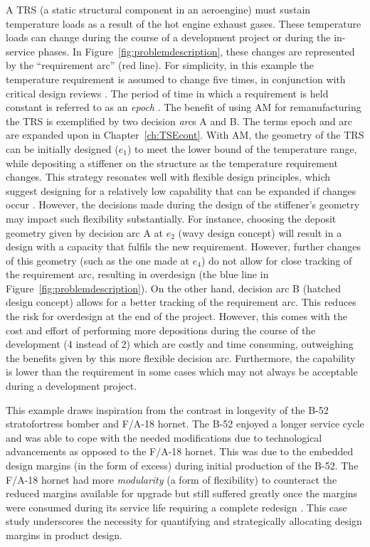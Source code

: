 A \acf{TRS} (a static structural component in an aeroengine) must sustain temperature loads as a result of the hot engine exhaust gases. These temperature loads can change during the course of a development project or during the in-service phases. In Figure~\ref{fig:problemdescription}, these changes are represented by the “requirement arc” (red line). For simplicity, in this example the temperature requirement is assumed to change five times, in conjunction with critical design reviews \cite{Cooper2008}. The period of time in which a requirement is held constant is referred to as an \textit{epoch} \cite{McManus2007}. The benefit of using \ac{AM} for remanufacturing the \ac{TRS} is exemplified by two decision \textit{arc}s A and B. The terms epoch and arc are expanded upon in Chapter~\ref{ch:TSEcont}. With \ac{AM}, the geometry of the \ac{TRS} can be initially designed ($e_1$) to meet the lower bound of the temperature range, while depositing a stiffener on the structure as the temperature requirement changes. This strategy resonates well with flexible design principles, which suggest designing for a relatively low capability that can be expanded if changes occur \cite{DeNeufville2011}. However, the decisions made during the design of the stiffener’s geometry may impact such flexibility substantially. For instance, choosing the deposit geometry given by decision arc A at $e_2$ (wavy design concept) will result in a design with a capacity that fulfils the new requirement. However, further changes of this geometry (such as the one made at $e_4$) do not allow for close tracking of the requirement arc, resulting in overdesign (the blue line in Figure~\ref{fig:problemdescription}). On the other hand, decision arc B (hatched design concept) allows for a better tracking of the requirement arc. This reduces the risk for overdesign at the end of the project. However, this comes with the cost and effort of performing more depositions during the course of the development (4 instead of 2) which are costly and time consuming, outweighing the benefits given by this more flexible decision arc. Furthermore, the capability is lower than the requirement in some cases which may not always be acceptable during a development project.

This example draws inspiration from the contrast in longevity of the B-52 stratofortress bomber and F/A-18 hornet. The B-52 enjoyed a longer service cycle and was able to cope with the needed modifications due to technological advancements as opposed to the F/A-18 hornet. This was due to the embedded design margins (in the form of excess) during initial production of the B-52. The F/A-18 hornet had more \textit{modularity} (a form of flexibility) to counteract the reduced margins available for upgrade but still suffered greatly once the margins were consumed during its service life requiring a complete redesign \cite{Long2017}. This case study underscores the necessity for quantifying and strategically allocating design margins in product design.

